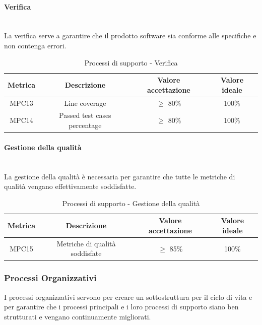 \documentclass[10pt]{article}
\begin{document}
\begin{justify}
\paragraph{Verifica}\mbox{}\\
La verifica serve a garantire che il prodotto software sia conforme alle specifiche e non contenga errori.\\
\begin{table}[H]
  \centering
\begin{tabular}{|c|c|c|c|}
  \hline
  \textbf{Metrica} & \textbf{Descrizione} & \textbf{Valore accettazione} & \textbf{Valore ideale}\\
  \hline
  MPC13 & Line coverage & $\geq$ 80\% & 100\% \\
  \hline
  MPC14 & Passed test cases percentage & $\geq$ 80\% & 100\% \\
  \hline
\end{tabular}
\caption{Processi di supporto - Verifica}
\label{tab:verifica}
\end{table}

\paragraph{Gestione della qualità}\mbox{}\\
La gestione della qualità è necessaria per garantire che tutte le metriche di qualità vengano effettivamente soddisfatte.\\
\begin{table}[H]
  \centering
\begin{tabular}{|c|c|c|c|}
  \hline
  \textbf{Metrica} & \textbf{Descrizione} & \textbf{Valore accettazione} & \textbf{Valore ideale}\\
  \hline
  MPC15 & Metriche di qualità soddisfate & $\geq$ 85\% & 100\% \\
  \hline
\end{tabular}
\caption{Processi di supporto - Gestione della qualità}
\label{tab:gestione della qualità}
\end{table}

\subsubsection{Processi Organizzativi}
I processi organizzativi servono per creare un sottostruttura per il ciclo di vita e
per garantire che i processi principali e i loro processi di supporto siano ben strutturati e vengano continuamente migliorati.\\

\end{justify}
\end{document}
